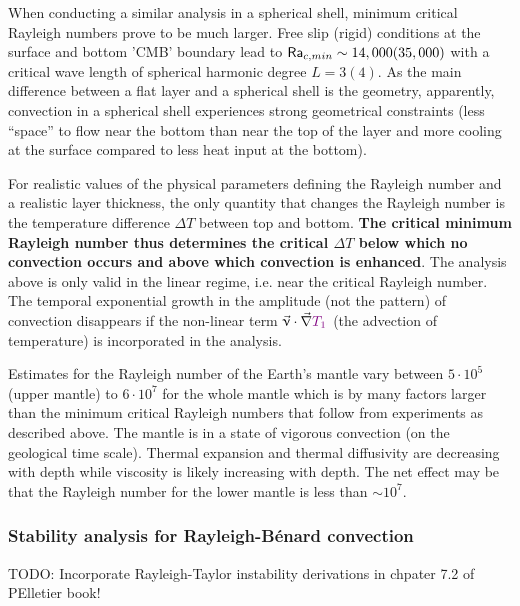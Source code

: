 When conducting a similar analysis in a spherical shell, minimum critical Rayleigh
numbers prove to be much larger. Free slip (rigid) conditions at the surface and bottom
'CMB' boundary lead to ${\mathsf{Ra}}_{c,min}\sim 14,000 (35,000)$ with a critical wave length of
spherical harmonic degree $L=3 (4)$. As the main difference between a flat layer and a
spherical shell is the geometry, apparently, convection in a spherical shell experiences
strong geometrical constraints (less “space” to flow near the bottom than near the top of
the layer and more cooling at the surface compared to less heat input at the bottom).

For realistic values of the physical parameters defining the Rayleigh number and a
realistic layer thickness, the only quantity that changes the Rayleigh number is the
temperature difference $\Delta T$ between top and bottom. {\bf The critical minimum Rayleigh
number thus determines the critical $\Delta T$ below which no convection occurs and above
which convection is enhanced}. The analysis above is only valid in the linear regime, i.e.
near the critical Rayleigh number. The temporal exponential growth in the amplitude (not
the pattern) of convection disappears if the non-linear term $\vec\upnu\cdot\vec\nabla {\color{violet}T_1}$ 
(the advection of temperature) is incorporated in the analysis.

Estimates for the Rayleigh number of the Earth's mantle vary between $5\cdot 10^5$ (upper
mantle) to $6\cdot 10^7$ for the whole mantle which is by many factors larger than the minimum
critical Rayleigh numbers that follow from experiments as described above. The mantle
is in a state of vigorous convection (on the geological time scale). Thermal expansion and
thermal diffusivity are decreasing with depth while viscosity is likely increasing with
depth. The net effect may be that the Rayleigh number for the lower mantle is less than $\sim 10^7$.



\newpage %
\subsubsection{Stability analysis for Rayleigh-B\'enard convection} \label{ss:sarb} 


\vspace{2cm}

TODO: Incorporate Rayleigh-Taylor instability derivations in chpater 7.2 of PElletier book!

